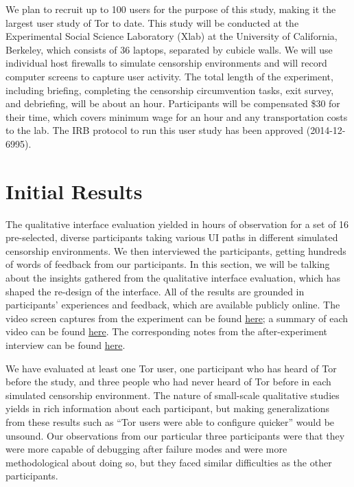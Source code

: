 \documentclass{template}
\begin{document}
We plan to recruit up to 100 users for the purpose of this study,
making it the largest user study of Tor to date.  This study will be conducted at the
Experimental Social Science Laboratory (Xlab)
at the University of California, Berkeley, which consists of 36 laptops,
separated by cubicle walls. We will use individual host firewalls to simulate
censorship environments and will record computer screens to capture 
user activity. The total length of the experiment, including briefing, completing the censorship 
circumvention tasks, exit survey, and debriefing, will be about an hour.
Participants will be compensated \$30 for their time, which covers
minimum wage for an hour and any transportation costs to the lab. 
The IRB protocol to run this user study has been approved (2014-12-6995). 

\section{Initial Results}

The qualitative interface evaluation yielded in hours of observation for a set of 16 pre-selected, diverse participants taking various UI paths in different simulated censorship environments. We then interviewed the participants, getting hundreds of words of feedback from our participants. In this section, we will be talking about the insights gathered from the qualitative interface evaluation, which has shaped the re-design of the interface. All of the results are grounded in participants' experiences and feedback, which are available publicly online. The video screen captures from the experiment can be found \href{https://github.com/lindanlee/circumvention-ux-tor/tree/master/sessions/pre/videos}{here}; a summary of each video can be found \href{https://github.com/lindanlee/circumvention-ux-tor/blob/master/sessions/pre/participant-summaries.txt}{here}. The corresponding notes from the after-experiment interview can be found \href{https://github.com/lindanlee/circumvention-ux-tor/tree/master/sessions/pre/notes}{here}. 

We have evaluated at least one Tor user, one participant who has heard of Tor before the study, and three people who had never heard of Tor before in each simulated censorship environment. The nature of small-scale qualitative studies yields in rich information about each participant, but making generalizations from these results such as ``Tor users were able to configure quicker'' would be unsound. Our observations from our particular three participants were that they were more capable of debugging after failure modes and were more methodological about doing so, but they faced similar difficulties as the other participants. 
\end{document}
